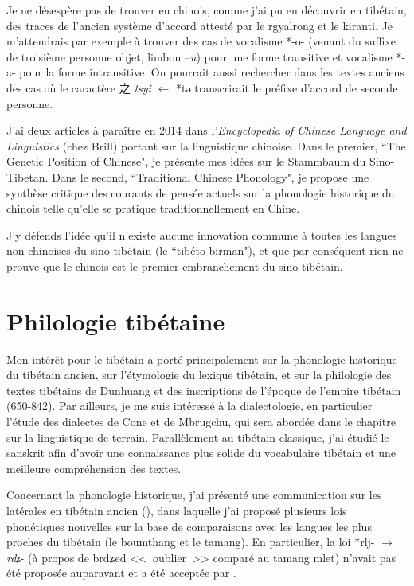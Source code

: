 \documentclass[oldfontcommands,oneside,a4paper,11pt]{memoir}
\newcommand{\ipa}[1]{{\phon #1}} %
\newcommand{\zh}[1]{{\cn #1}}
\begin{document}
Je ne désespère pas de trouver en chinois, comme j'ai pu en découvrir en tibétain, des traces de l'ancien système d'accord attesté par le rgyalrong et le kiranti. Je m'attendrais par exemple à trouver des cas de vocalisme *-o- (venant du suffixe de troisième personne objet, limbou --\textit{u}) pour une forme transitive et vocalisme *-a- pour la forme intransitive. On pourrait aussi rechercher dans les textes anciens des cas où le caractère \zh{之} \textit{tsyi} $\leftarrow$ *tə transcrirait le préfixe d'accord de seconde personne.  


J'ai deux articles à paraître en 2014 dans l'\textit{Encyclopedia of Chinese Language and Linguistics} (chez Brill) portant sur la linguistique chinoise. Dans le premier, ``The Genetic Position of Chinese", je présente mes idées sur le Stammbaum du Sino-Tibetan. Dans le second, ``Traditional Chinese Phonology", je propose une synthèse critique des courants de pensée actuels sur la phonologie historique du chinois telle qu'elle se pratique traditionnellement en Chine.

J'y défends l'idée qu'il n'existe aucune innovation commune à toutes les langues non-chinoises du sino-tibétain (le ``tibéto-birman"), et que par conséquent rien ne prouve que le chinois est le premier embranchement du sino-tibétain.

\section{Philologie tibétaine}
Mon intérêt pour le tibétain a porté principalement sur la phonologie historique du tibétain ancien, sur l’étymologie du lexique tibétain, et sur la philologie des textes tibétains de Dunhuang et des inscriptions de l’époque de l’empire tibétain (650-842). Par ailleurs, je me suis intéressé à la dialectologie, en particulier l'étude des dialectes de Cone et de Mbrugchu, qui sera   abordée dans le chapitre sur la linguistique de terrain. Parallèlement au tibétain classique, j'ai étudié le sanskrit afin d'avoir une connaissance plus solide du vocabulaire tibétain et une meilleure compréhension des textes.

Concernant la phonologie historique, j’ai présenté une communication sur les latérales en tibétain ancien (\citealt{jacques04thimphu}), dans laquelle j’ai proposé plusieurs lois phonétiques nouvelles sur la base de comparaisons avec les langues les plus proches du tibétain (le boumthang et le tamang). En particulier, la loi *rlj- $\rightarrow $ \textit{rdʑ}- (à propos de \ipa{brdʑed} <<~oublier~>> comparé au tamang \ipa{mlet}) n'avait pas été proposée auparavant et a été acceptée par \citet{hill13laterals}.
\end{document}
